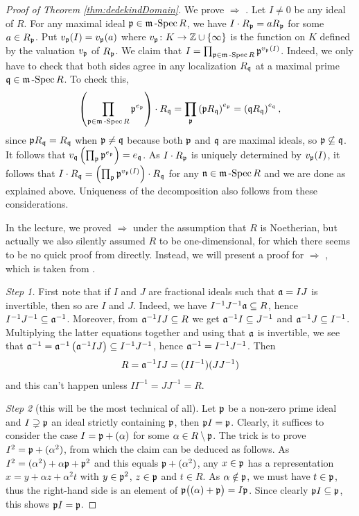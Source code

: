 \documentclass[a4paper,parskip=half,numbers=enddot, DIV=12]{scrreprt}
\begin{document}
\begin{proof}[Proof of Theorem \ref{thm:dedekindDomain}]
We prove  $\Rightarrow$ . Let $I\neq 0$ be any ideal of $R$. For any maximal ideal $\pp\in \mSpec R$, we have $I\cdot R_\pp = a R_\pp$
for some $a\in R_\pp$. Put $v_\pp(I) = v_\pp(a)$ where $v_\pp\colon K\morphism \mathbb Z\cup \{\infty\}$ is the
function on $K$ defined by the valuation $v_\pp$ of $R_\pp$.
We claim that $I=\prod_{\pp\in \mSpec R} \pp^{v_\pp(I)}$. Indeed, we only have to check that both sides agree in any localization $R_\qq$ at a maximal prime $\qq\in\mSpec R$. To check this,
\begin{align*}
\left(\prod_{\pp\in \mSpec R} \pp^{e_\pp}\right)\cdot R_\qq = \prod_{\pp}\left(\pp R_\qq\right)^{e_\pp} = \left(\qq R_\qq\right)^{e_\qq},
\end{align*}
since $\pp R_\qq = R_\qq$ when $\pp\neq \qq$ because
both $\pp$ and $\qq$ are maximal ideals, so $\pp\not\subseteq \qq$.
It follows that $v_\qq\left(\prod_\pp \pp^{e_\pp}\right) = e_\qq$. As $I\cdot R_\pp$ is uniquely determined by $v_\pp(I)$, it follows
that $I\cdot R_\qq = \left(\prod_\pp \pp^{v_\pp(I)}\right)\cdot R_\qq$ for any $\nn\in \mSpec R$ and we are done as explained above.
Uniqueness of the decomposition
also follows from these considerations.


In the lecture, we proved  $\Rightarrow$  under the assumption that $R$ is Noetherian, but actually we also silently assumed $R$ to be one-dimensional, for which there seems to be no quick proof from  directly. Instead, we will present a proof for  $\Rightarrow$ , which is taken from \cite[pp.~83-84]{matsumuraCRT}. 

\emph{Step 1.} First note that if $I$ and $J$ are fractional ideals such that $\aa=IJ$ is invertible, then so are $I$ and $J$. Indeed, we have $I^{-1}J^{-1}\aa\subseteq R$, hence $I^{-1}J^{-1}\subseteq \aa^{-1}$. Moreover, from $\aa^{-1}IJ\subseteq R$ we get $\aa^{-1}I\subseteq J^{-1}$ and $\aa^{-1}J\subseteq I^{-1}$. Multiplying the latter equations together and using that $\aa$ is invertible, we see that $\aa^{-1}=\aa^{-1}\left(\aa^{-1}IJ\right)\subseteq I^{-1}J^{-1}$, hence $\aa^{-1}=I^{-1}J^{-1}$. Then
\begin{align*}
	R=\aa^{-1}IJ=(II^{-1})(JJ^{-1})
\end{align*}
and this can't happen unless $II^{-1}=JJ^{-1}=R$.

\emph{Step 2} (this will be the most technical of all). Let $\pp$ be a non-zero prime ideal and $I\supsetneq\pp$ an ideal strictly containing $\pp$, then $\pp I=\pp$. Clearly, it suffices to consider the case $I=\pp+(\alpha)$ for some $\alpha\in R\setminus \pp$. The trick is to prove $I^2=\pp+(\alpha^2)$, from which the claim can be deduced as follows. As $I^2=(\alpha^2)+\alpha\pp+\pp^2$ and this equals $\pp+(\alpha^2)$, any $x\in\pp$ has a representation $x=y+\alpha z+\alpha^2t$ with $y\in\pp^2$, $z\in \pp$ and $t\in R$. As $\alpha\notin\pp$, we must have $t\in \pp$, thus the right-hand side is an element of $\pp\big((\alpha)+\pp\big)=I\pp$. Since clearly $\pp I\subseteq\pp$, this shows $\pp I=\pp$.


\end{proof}
\end{document}
